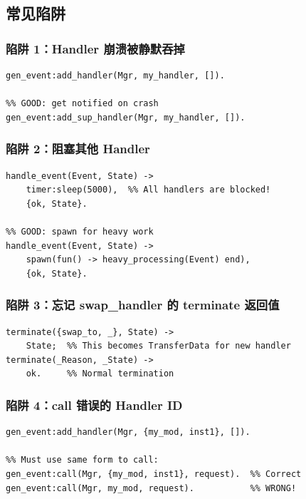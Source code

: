 \documentclass[a4paper,11pt]{article}
\begin{document}
\subsection{常见陷阱}

\subsubsection{陷阱 1：Handler 崩溃被静默吞掉}

\begin{lstlisting}[style=erlangstyle]
%% BAD: handler crashes silently
gen_event:add_handler(Mgr, my_handler, []).

%% GOOD: get notified on crash
gen_event:add_sup_handler(Mgr, my_handler, []).
\end{lstlisting}

\subsubsection{陷阱 2：阻塞其他 Handler}

\begin{lstlisting}[style=erlangstyle]
%% BAD: blocks all other handlers
handle_event(Event, State) ->
    timer:sleep(5000),  %% All handlers are blocked!
    {ok, State}.

%% GOOD: spawn for heavy work
handle_event(Event, State) ->
    spawn(fun() -> heavy_processing(Event) end),
    {ok, State}.
\end{lstlisting}

\subsubsection{陷阱 3：忘记 swap\_handler 的 terminate 返回值}

\begin{lstlisting}[style=erlangstyle]
%% terminate must return transfer data when swapping
terminate({swap_to, _}, State) ->
    State;  %% This becomes TransferData for new handler
terminate(_Reason, _State) ->
    ok.     %% Normal termination
\end{lstlisting}

\subsubsection{陷阱 4：call 错误的 Handler ID}

\begin{lstlisting}[style=erlangstyle]
%% If handler was added as {Module, Id}:
gen_event:add_handler(Mgr, {my_mod, inst1}, []).

%% Must use same form to call:
gen_event:call(Mgr, {my_mod, inst1}, request).  %% Correct
gen_event:call(Mgr, my_mod, request).           %% WRONG!
\end{lstlisting}
\end{document}
